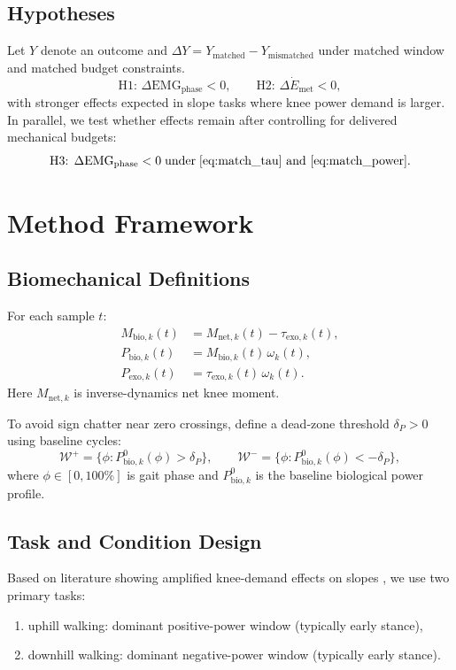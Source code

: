 \documentclass[lettersize,journal]{IEEEtran}
\begin{document}
\subsection{Hypotheses}
Let $Y$ denote an outcome and $\Delta Y = Y_{\mathrm{matched}}-Y_{\mathrm{mismatched}}$ under matched window and matched budget constraints.
\begin{equation}
\text{H1: } \Delta \mathrm{EMG}_{\mathrm{phase}} < 0,
\qquad
\text{H2: } \Delta \dot E_{\mathrm{met}} < 0,
\label{eq:hypothesis_h1h2}
\end{equation}
with stronger effects expected in slope tasks where knee power demand is larger.
In parallel, we test whether effects remain after controlling for delivered mechanical budgets:
\begin{equation}
\text{H3: } \Delta \mathrm{EMG}_{\mathrm{phase}}<0 \;\text{under}\; \eqref{eq:match_tau}\text{ and }\eqref{eq:match_power}.
\label{eq:h3}
\end{equation}

\section{Method Framework}
\subsection{Biomechanical Definitions}
For each sample $t$:
\begin{align}
M_{\mathrm{bio},k}(t) &= M_{\mathrm{net},k}(t)-\tau_{\mathrm{exo},k}(t),
\label{eq:mbio}\\
P_{\mathrm{bio},k}(t) &= M_{\mathrm{bio},k}(t)\,\omega_k(t),
\label{eq:pbio}\\
P_{\mathrm{exo},k}(t) &= \tau_{\mathrm{exo},k}(t)\,\omega_k(t).
\label{eq:pexo}
\end{align}
Here $M_{\mathrm{net},k}$ is inverse-dynamics net knee moment.

To avoid sign chatter near zero crossings, define a dead-zone threshold $\delta_P>0$ using baseline cycles:
\begin{equation}
\mathcal{W}^{+}=\{\phi: P_{\mathrm{bio},k}^{0}(\phi)>\delta_P\},
\qquad
\mathcal{W}^{-}=\{\phi: P_{\mathrm{bio},k}^{0}(\phi)<-\delta_P\},
\label{eq:phase_windows}
\end{equation}
where $\phi\in[0,100\%]$ is gait phase and $P_{\mathrm{bio},k}^{0}$ is the baseline biological power profile.

\subsection{Task and Condition Design}
Based on literature showing amplified knee-demand effects on slopes \cite{park2020hingefree,lee2023context,nuckols2020mechanics}, we use two primary tasks:
\begin{enumerate}
    \item uphill walking: dominant positive-power window (typically early stance),
    \item downhill walking: dominant negative-power window (typically early stance).
\end{enumerate}
\end{document}
